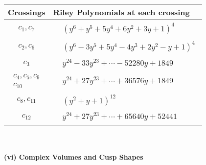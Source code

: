 \documentclass[1p]{elsarticle_modified}
\theoremstyle{definition}
\begin{document}
\begin{tabular}{m{50pt}|m{274pt}}
Crossings & \hspace{64pt}Riley Polynomials at each crossing \\
\hline $$\begin{aligned}c_{1},c_{7}\end{aligned}$$&$\begin{aligned}
&(y^6+y^5+5 y^4+6 y^2+3 y+1)^4
\end{aligned}$\\
\hline $$\begin{aligned}c_{2},c_{6}\end{aligned}$$&$\begin{aligned}
&(y^6-3 y^5+5 y^4-4 y^3+2 y^2- y+1)^4
\end{aligned}$\\
\hline $$\begin{aligned}c_{3}\end{aligned}$$&$\begin{aligned}
&y^{24}-33 y^{23}+\cdots-52280 y+1849
\end{aligned}$\\
\hline $$\begin{aligned}c_{4},c_{5},c_{9}\\c_{10}\end{aligned}$$&$\begin{aligned}
&y^{24}+27 y^{23}+\cdots+36576 y+1849
\end{aligned}$\\
\hline $$\begin{aligned}c_{8},c_{11}\end{aligned}$$&$\begin{aligned}
&(y^2+y+1)^{12}
\end{aligned}$\\
\hline $$\begin{aligned}c_{12}\end{aligned}$$&$\begin{aligned}
&y^{24}+27 y^{23}+\cdots+65640 y+52441
\end{aligned}$\\
\hline
\end{tabular}\\~\\
\newpage\flushleft \textbf{(vi) Complex Volumes and Cusp Shapes}
\end{document}
